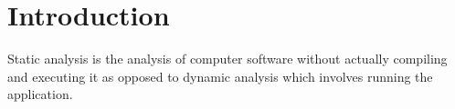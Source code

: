 \section{Introduction}

Static analysis is the analysis of computer software without actually compiling and executing it as opposed to dynamic analysis\cite{dynamic_analysis} which involves running the application. 